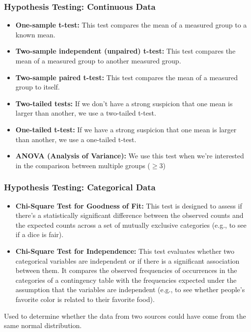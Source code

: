 \documentclass{article}
\theoremstyle{definition}
\theoremstyle{theorem}
\theoremstyle{theorem}
\theoremstyle{theorem}
\theoremstyle{theorem}
\theoremstyle{definition}
\theoremstyle{definition}
\theoremstyle{definition}
\theoremstyle{definition}
\theoremstyle{definition}
\begin{document}
\subsubsection*{Hypothesis Testing: Continuous Data}

\begin{itemize}
    \item \textbf{One-sample t-test:} This test compares the mean of a measured group to a known mean.
    \item \textbf{Two-sample independent (unpaired) t-test:} This test compares the mean of a measured group to another measured group.
    \item \textbf{Two-sample paired t-test:} This test compares the mean of a measured group to itself.
    \item \textbf{Two-tailed tests:} If we don't have a strong suspicion that one mean is larger than another, we use a two-tailed t-test.
    \item \textbf{One-tailed t-test:} If we have a strong suspicion that one mean is larger than another, we use a one-tailed t-test.
    \item \textbf{ANOVA (Analysis of Variance):} We use this test when we're interested in the comparison between multiple groups ($\geq 3$)
\end{itemize}

\subsubsection*{Hypothesis Testing: Categorical Data}

\begin{itemize}
\item \textbf{Chi-Square Test for Goodness of Fit:} This test is designed to assess if there's a statistically significant difference between the observed counts and the expected counts across a set of mutually exclusive categories (e.g., to see if a dice is fair).
\item \textbf{Chi-Square Test for Independence: } This test evaluates whether two categorical variables are independent or if there is a significant association between them. It compares the observed frequencies of occurrences in the categories of a contingency table with the frequencies expected under the assumption that the variables are independent (e.g., to see whether people's favorite color is related to their favorite food).
\end{itemize}


Used to determine whether the data from two sources could have come from the same normal distribution.
\end{document}
